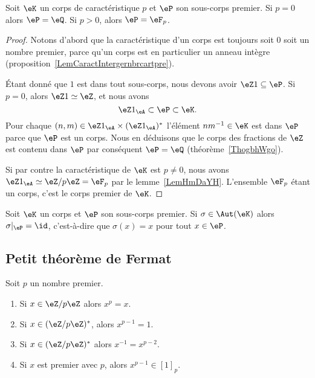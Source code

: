 \begin{proposition}
	Soit \( \eK\) un corps de caractéristique \( p\) et \( \eP\) son sous-corps premier. Si \( p=0\) alors \( \eP=\eQ\). Si \( p>0\), alors \( \eP=\eF_p\).
\end{proposition}

\begin{proof}
	Notons d'abord que la caractéristique d'un corps est toujours soit 0 soit un nombre premier, parce qu'un corps est en particulier un anneau intègre (proposition~\ref{LemCaractIntergernbrcartpre}).

	Étant donné que \( 1\) est dans tout sous-corps, nous devons avoir \( \eZ 1\subseteq \eP\). Si \( p=0\), alors \( \eZ 1\simeq \eZ\), et nous avons
	\begin{equation}
		\eZ 1_{\eA}\subset \eP\subset \eK.
	\end{equation}
	Pour chaque \( (n,m)\in \eZ 1_{\eA}\times (\eZ 1_{\eA})^*\) l'élément \( nm^{-1}\in \eK\) est dans \( \eP\) parce que \( \eP\) est un corps. Nous en déduisons que le corps des fractions de \( \eZ\) est contenu dans \( \eP\) par conséquent \( \eP=\eQ\) (théorème~\ref{ThogbhWgo}).

	Si par contre la caractéristique de \( \eK\) est \( p\neq 0\), nous avons \( \eZ 1_{\eA}\simeq\eZ/p\eZ=\eF_p\) par le lemme~\ref{LemHmDaYH}. L'ensemble \( \eF_p\) étant un corps, c'est le corps premier de \( \eK\).
\end{proof}

\begin{proposition}     \label{PropqPPrgJ}
	Soit \( \eK\) un corps et \( \eP\) son sous-corps premier. Si \( \sigma\in\Aut(\eK)\) alors \( \sigma|_{\eP}=\id\), c'est-à-dire que \( \sigma(x)=x\) pour tout \( x\in \eP\).
\end{proposition}

\subsection{Petit théorème de Fermat}

\begin{theorem}       \label{ThoOPQOiO}
	Soit \( p\) un nombre premier.
	\begin{enumerate}
		\item
		      Si \( x\in \eZ/p\eZ\) alors \( x^p=x\).
		\item
		      Si \( x\in(\eZ/p\eZ)^*\), alors \( x^{p-1}=1\).
		\item
		      Si \( x\in (\eZ/p\eZ)^*\) alors \( x^{-1}=x^{p-2}\).
		\item       \label{ITEMooRNIVooOIzqgc}
		      Si \( x\) est premier avec \( p\), alors \( x^{p-1}\in [1]_p\).
	\end{enumerate}
\end{theorem}

